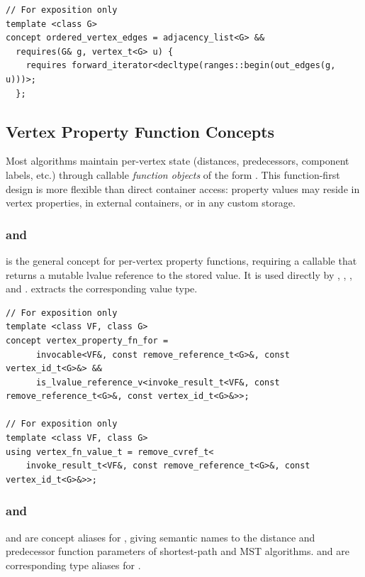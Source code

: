 \begin{lstlisting}
// For exposition only
template <class G>
concept ordered_vertex_edges = adjacency_list<G> &&
  requires(G& g, vertex_t<G> u) {
    requires forward_iterator<decltype(ranges::begin(out_edges(g, u)))>;
  };
\end{lstlisting}

\subsection{Vertex Property Function Concepts}
Most algorithms maintain per-vertex state (distances, predecessors, component labels, etc.)
through callable \emph{function objects} of the form
.
This function-first design is more flexible than direct container access: property values may
reside in vertex properties, in external containers, or in any custom storage.

\subsubsection{ and }
 is the general concept for per-vertex property functions,
requiring a callable that returns a mutable lvalue reference to the stored value.
It is used directly by , , ,
and .
 extracts the corresponding value type.

\begin{lstlisting}
// For exposition only
template <class VF, class G>
concept vertex_property_fn_for =
      invocable<VF&, const remove_reference_t<G>&, const vertex_id_t<G>&> &&
      is_lvalue_reference_v<invoke_result_t<VF&, const remove_reference_t<G>&, const vertex_id_t<G>&>>;

// For exposition only
template <class VF, class G>
using vertex_fn_value_t = remove_cvref_t<
    invoke_result_t<VF&, const remove_reference_t<G>&, const vertex_id_t<G>&>>;
\end{lstlisting}

\subsubsection{ and }
 and  are concept aliases for
, giving semantic names to the distance and predecessor
function parameters of shortest-path and MST algorithms.
 and  are corresponding
type aliases for .

